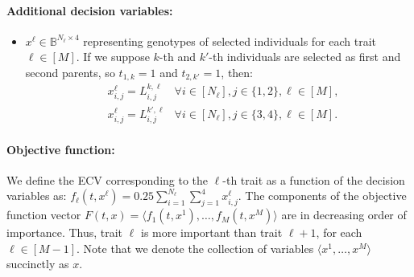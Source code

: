 \documentclass[12pt, a4paper, bibliography=totoc]{scrartcl}
\begin{document}
\paragraph{Additional decision variables:}
	\begin{itemize}
\item $x^\ell \in \mathbb{B}^{N_\ell\times4}$ representing genotypes of selected individuals for each trait $\ell \in [M]$. If we suppose $k$-th and $k'$-th individuals are selected as first and second parents, so $t_{1,k}=1$ and $t_{2,k'}=1$, then:
\begin{align*}
    &x_{i,j}^\ell = L^{k,\ell}_{i,j} & \forall i \in [N_{\ell}],  j \in \{1,2\},  \ell \in [M],\\
    &x_{i,j}^\ell = L^{k',\ell}_{i,j} & \forall i \in [N_{\ell}], j \in \{3,4\}, \ell \in [M].
\end{align*}
\end{itemize}
\paragraph{Objective function:}
We define the ECV corresponding to the $\ell$-th trait as a function of the decision variables as:
$
f_{\ell}(t,x^\ell)=0.25\sum\limits_{i=1}^{N_\ell}\sum\limits_{j =1}^4 x_{i,j}^\ell.
$
The components  of the objective function vector $F(t,x)=\langle f_1(t,x^1), \ldots,f_M(t,x^M)\rangle$ are in decreasing order of importance.  Thus, trait $\ell$ is more important than trait $\ell+1$, for each $\ell\in[M-1]$. Note that we denote the collection of variables $\langle x^1,\ldots,x^M\rangle$ succinctly as $x$.
\end{document}
